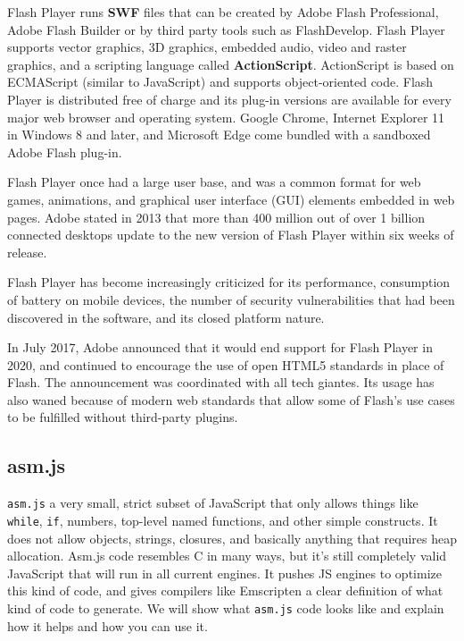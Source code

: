 Flash Player runs \textbf{SWF} files that can be created by Adobe Flash Professional, Adobe Flash Builder or by third party tools such as FlashDevelop. 
Flash Player supports vector graphics, 3D graphics, embedded audio, video and raster graphics, and a scripting language called \textbf{ActionScript}. 
ActionScript is based on ECMAScript (similar to JavaScript) and supports object-oriented code. 
Flash Player is distributed free of charge and its plug-in versions are available for every major web browser and operating system. 
Google Chrome, Internet Explorer 11 in Windows 8 and later, and Microsoft Edge come bundled with a sandboxed Adobe Flash plug-in.

Flash Player once had a large user base, and was a common format for web games, animations, and graphical user interface (GUI) elements embedded in web pages. 
Adobe stated in 2013 that more than 400 million out of over 1 billion connected desktops update to the new version of Flash Player within six weeks of release. 

Flash Player has become increasingly criticized for its performance, consumption of battery on mobile devices, the number of security vulnerabilities that had been discovered in the software, and its closed platform nature.

In July 2017, Adobe announced that it would end support for Flash Player in 2020, and continued to encourage the use of open HTML5 standards in place of Flash. 
The announcement was coordinated with all tech giantes.
Its usage has also waned because of modern web standards that allow some of Flash's use cases to be fulfilled without third-party plugins.

\subsection{asm.js} \cite{asm17}

\texttt{asm.js} a very small, strict subset of JavaScript that only allows things like \texttt{while}, \texttt{if}, numbers, top-level named functions, and other simple constructs. 
It does not allow objects, strings, closures, and basically anything that requires heap allocation. 
Asm.js code resembles C in many ways, but it's still completely valid JavaScript that will run in all current engines. 
It pushes JS engines to optimize this kind of code, and gives compilers like Emscripten a clear definition of what kind of code to generate. 
We will show what \texttt{asm.js} code looks like and explain how it helps and how you can use it.

